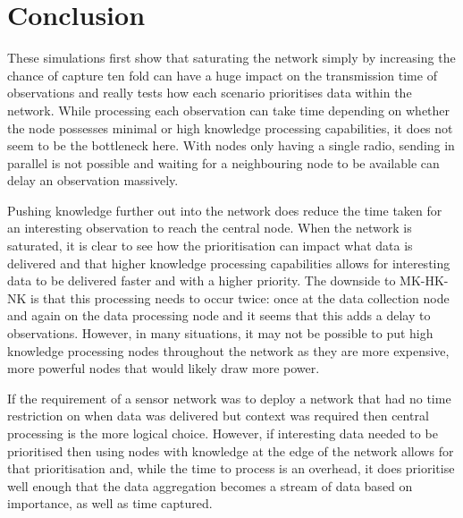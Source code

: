 \section{Conclusion}\label{sim:conc}

These simulations first show that saturating the network simply by increasing the chance of capture ten fold can have a huge impact on the transmission time of observations and really tests how each scenario prioritises data within the network. While processing each observation can take time depending on whether the node possesses minimal or high knowledge processing capabilities, it does not seem to be the bottleneck here. With nodes only having a single radio, sending in parallel is not possible and waiting for a neighbouring node to be available can delay an observation massively.

Pushing knowledge further out into the network does reduce the time taken for an interesting observation to reach the central node. When the network is saturated, it is clear to see how the prioritisation can impact what data is delivered and that higher knowledge processing capabilities allows for interesting data to be delivered faster and with a higher priority. The downside to MK-HK-NK is that this processing needs to occur twice: once at the data collection node and again on the data processing node and it seems that this adds a delay to observations. However, in many situations, it may not be possible to put high knowledge processing nodes throughout the network as they are more expensive, more powerful nodes that would likely draw more power.

If the requirement of a sensor network was to deploy a network that had no time restriction on when data was delivered but context was required then central processing is the more logical choice. However, if interesting data needed to be prioritised then using nodes with knowledge at the edge of the network allows for that prioritisation and, while the time to process is an overhead, it does prioritise well enough that the data aggregation becomes a stream of data based on importance, as well as time captured.

	
